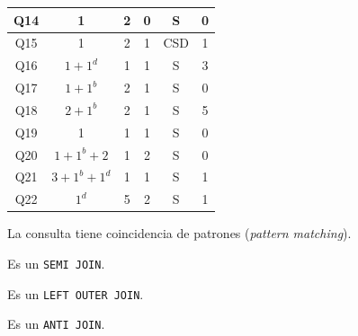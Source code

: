 \documentclass[12pt, letter paper]{report}
\begin{document}
\begin{table}[H]
\begin{threeparttable}
\begin{tabular}{| c | c | c | c | c | c |}
               Q14          &           1           &      2     &            0           &       S     &       0       \\ \hline
               Q15          &           1           &      2     &            1           &      CSD    &       1       \\ \hline
               Q16\tnote{a} &       $1 + 1^d$       &      1     &            1           &       S     &       3       \\ \hline
               Q17          &       $1 + 1^b$       &      2     &            1           &       S     &       0       \\ \hline
               Q18          &       $2 + 1^b$       &      2     &            1           &       S     &       5       \\ \hline
               Q19          &           1           &      1     &            1           &       S     &       0       \\ \hline
               Q20\tnote{a} &     $1 + 1^b + 2$     &      1     &            2           &       S     &       0       \\ \hline
               Q21          &    $3 + 1^b + 1^d$    &      1     &            1           &       S     &       1       \\ \hline
               Q22          &         $1^d$         &      5     &            2           &       S     &       1       \\ \hline
          \end{tabular}
          \label{tab:queries}
          \begin{tablenotes}
            \item[a] La consulta tiene coincidencia de patrones (\textit{pattern matching}).
            \item[b] Es un \texttt{SEMI JOIN}.
            \item[c] Es un \texttt{LEFT OUTER JOIN}.
            \item[d] Es un \texttt{ANTI JOIN}.
          \end{tablenotes}
          \end{threeparttable}
        \end{table}
\end{document}

